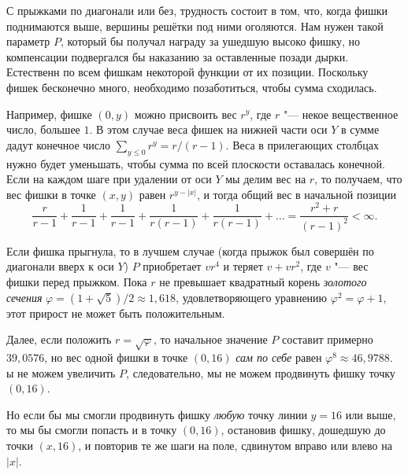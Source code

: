\documentclass[twoside]{book}
\begin{document}

С прыжками по диагонали или без, трудность состоит в том, что, когда фишки поднимаются выше, вершины решётки под ними оголяются.
Нам нужен такой параметр $P$, который бы получал награду за ушедшую высоко фишку, но  компенсации подвергался бы наказанию за оставленные позади дырки.
Естественн по всем фишкам некоторой функции от их позиции.
Поскольку фишек бесконечно много, необходимо позаботиться, чтобы сумма сходилась.

Например, фишке  $(0, y)$ можно присвоить вес $r^y$, где $r$ "--- некое вещественное число, большее $1$.
В этом случае веса фишек на нижней части оси $Y$ в сумме дадут конечное число $\sum_{y\le 0}r^y = r/(r-1)$.
Веса в прилегающих столбцах нужно будет уменьшать, чтобы сумма по всей плоскости оставалась конечной.
Если на каждом шаге при удалении от оси $Y$ мы делим вес на $r$, то получаем, что вес фишки в точке $(x, y)$ равен $r^{y - |x|}$, и тогда общий вес в начальной позиции  
\[\frac r{r-1} + \frac 1{r-1} +\frac 1{r-1} +\frac 1{r(r-1)} +\frac 1{r(r-1)} + \ldots =\frac{r^2+r}{(r-1)^2} <\infty.\]

Если фишка прыгнула, то в лучшем случае (когда прыжок был совершён по диагонали вверх к оси $Y$) $P$ приобретает $vr^4$ и теряет $v+vr^2$, где $v$ "--- вес фишки перед прыжком.
Пока $r$ не превышает квадратный корень  \emph{золотого сечения} $\varphi=(1+\sqrt5)/2\approx 1{,}618$, удовлетворяющего уравнению $\varphi^2=\varphi+1$, этот прирост не может быть положительным.

Далее, если положить $r = \sqrt{\varphi}$, то начальное значение $P$ составит примерно $39{,}0576$, но вес одной фишки в точке $(0, 16)$ \emph{сам по себе} равен $\varphi^8\approx 46{,}9788$.
ы не можем увеличить $P$,  следовательно, мы не можем продвинуть фишку  точку $(0, 16)$.

Но если бы мы смогли продвинуть фишку  \emph{любую} точку линии $y = 16$ или выше, то мы бы смогли попасть и в точку $(0, 16)$, остановив фишку, дошедшую до точки $(x, 16)$, и повторив те же шаги на поле, сдвинутом вправо или влево на~$|x|$.
\heart

{\sloppy 


}
\end{document}
